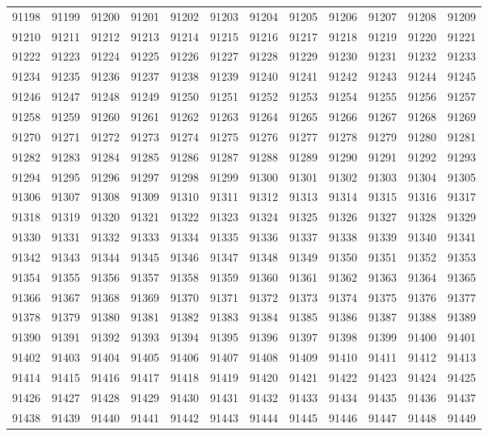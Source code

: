 \begin{center}
\begin{longtable}{llllllllllll}
91198 &91199 &91200 &91201 &91202 &91203 &91204 &91205 &91206 &91207 &91208 &91209 \\
91210 &91211 &91212 &91213 &91214 &91215 &91216 &91217 &91218 &91219 &91220 &91221 \\
91222 &91223 &91224 &91225 &91226 &91227 &91228 &91229 &91230 &91231 &91232 &91233 \\
91234 &91235 &91236 &91237 &91238 &91239 &91240 &91241 &91242 &91243 &91244 &91245 \\
91246 &91247 &91248 &91249 &91250 &91251 &91252 &91253 &91254 &91255 &91256 &91257 \\
91258 &91259 &91260 &91261 &91262 &91263 &91264 &91265 &91266 &91267 &91268 &91269 \\
91270 &91271 &91272 &91273 &91274 &91275 &91276 &91277 &91278 &91279 &91280 &91281 \\
91282 &91283 &91284 &91285 &91286 &91287 &91288 &91289 &91290 &91291 &91292 &91293 \\
91294 &91295 &91296 &91297 &91298 &91299 &91300 &91301 &91302 &91303 &91304 &91305 \\
91306 &91307 &91308 &91309 &91310 &91311 &91312 &91313 &91314 &91315 &91316 &91317 \\
91318 &91319 &91320 &91321 &91322 &91323 &91324 &91325 &91326 &91327 &91328 &91329 \\
91330 &91331 &91332 &91333 &91334 &91335 &91336 &91337 &91338 &91339 &91340 &91341 \\
91342 &91343 &91344 &91345 &91346 &91347 &91348 &91349 &91350 &91351 &91352 &91353 \\
91354 &91355 &91356 &91357 &91358 &91359 &91360 &91361 &91362 &91363 &91364 &91365 \\
91366 &91367 &91368 &91369 &91370 &91371 &91372 &91373 &91374 &91375 &91376 &91377 \\
91378 &91379 &91380 &91381 &91382 &91383 &91384 &91385 &91386 &91387 &91388 &91389 \\
91390 &91391 &91392 &91393 &91394 &91395 &91396 &91397 &91398 &91399 &91400 &91401 \\
91402 &91403 &91404 &91405 &91406 &91407 &91408 &91409 &91410 &91411 &91412 &91413 \\
91414 &91415 &91416 &91417 &91418 &91419 &91420 &91421 &91422 &91423 &91424 &91425 \\
91426 &91427 &91428 &91429 &91430 &91431 &91432 &91433 &91434 &91435 &91436 &91437 \\
91438 &91439 &91440 &91441 &91442 &91443 &91444 &91445 &91446 &91447 &91448 &91449 \\

\end{longtable}
\end{center}
